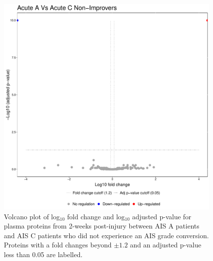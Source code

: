 \documentclass[9pt,lineno]{elife}
\begin{document}
\begin{figure}
\includegraphics[width=1\linewidth]{figures/openms_protein_quantification/label_free/volcano_plots/openms_volcano_plot_2021-08-10_0002} \caption{Volcano plot of log\(_10\) fold change and log\(_10\) adjusted p-value for plasma proteins from 2-weeks post-injury between AIS A patients and AIS C patients who did not experience an AIS grade conversion. Proteins with a fold changes beyond \(\pm 1.2\) and an adjusted p-value less than 0.05 are labelled.}\label{fig:volc-plot-acute-a-vs-acute-c-nonimp}
\end{figure}
\end{document}
